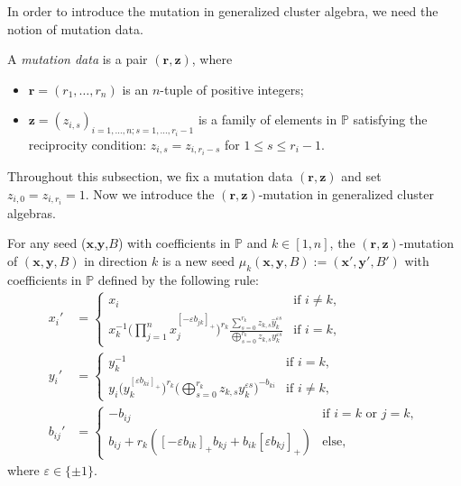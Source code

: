 \documentclass[pdftex]{sigma}
\numberwithin{equation}{section}
\begin{document}
In order to introduce the mutation in generalized cluster algebra, we need the notion of mutation data.
\begin{Definition}\label{D5}
 A {\it mutation data} is a pair $(\mathbf{r},\mathbf{z})$, where
 \begin{itemize}\itemsep=0pt
 \item $\mathbf{r}=(r_1,\dots,r_n)$ is an $n$-tuple of positive integers;
 \item $\mathbf{z}=(z_{i,s})_{i=1,\dots,n;s=1,\dots,r_{i}-1}$ is a family of elements in $\mathbb{P}$ satisfying the reciprocity condition: $z_{i,s}=z_{i,r_i-s}$ for $1\leq s\leq r_{i}-1$.
 \end{itemize}
\end{Definition}
Throughout this subsection, we fix a mutation data $(\mathbf{r},\mathbf{z})$ and set $z_{i,0}=z_{i,r_i}=1$. Now we introduce the $(\mathbf{r},\mathbf{z})$-mutation in generalized cluster algebras.
\begin{Definition}\label{D6}
 For any seed ($\mathbf{x}$,$\mathbf{y}$,$B$) with coefficients in $\mathbb{P}$ and $k\in[1,n]$, the $(\mathbf{r},\mathbf{z})$-mutation of $(\mathbf{x},\mathbf{y},B)$ in direction $k$ is a new seed $\mu_k(\mathbf{x},\mathbf{y},B):=(\mathbf{x}',\mathbf{y}',B') $ with coefficients in $\mathbb{P}$ defined by the following rule:
\begin{align}
x_i'&=
\begin{cases}
 x_i & \text{if $i\neq k$}, \\
 \displaystyle x_k^{-1}\biggl(\prod\limits_{j=1}^{n}x_j^{[-\varepsilon b_{jk}]_+}\biggr)^{r_k}\frac{\sum\limits_{s=0}^{r_k}z_{k,s}\hat{y}_k^{\varepsilon s}}{\mathop{\bigoplus}\limits_{s=0}^{r_k}z_{k,s}y_k^{\varepsilon s}}& \text{if $i=k$},
\end{cases}\label{E4}
\\
 y_i'&=
\begin{cases}
 y_k^{-1} & \text{if $i= k$}, \\
\displaystyle y_i\bigl(y_k^{[\varepsilon b_{ki}]_+}\bigr)^{r_k}\biggl(\mathop{\bigoplus}\limits_{s=0}^{r_k}z_{k,s}y_k^{\varepsilon s}\biggr)^{-b_{ki}}& \text{if $i\neq k$},
\end{cases}\label{E5}
 \\
 b_{ij}'&=
 \begin{cases}
-b_{ij} &\text{if $i=k$ or $j=k$},\\
b_{ij}+r_k([-\varepsilon b_{ik}]_+b_{kj}+b_{ik}[\varepsilon b_{kj}]_+) &\text{else},
\end{cases}\label{E6}
\end{align}
where $\varepsilon\in\{\pm 1\}$.
\end{Definition}
\end{document}
